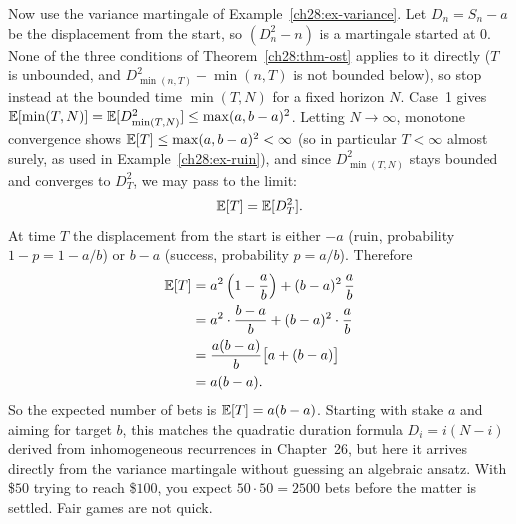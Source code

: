 \begin{example}
\label{ch28:ex-duration}
Now use the variance martingale of Example~\ref{ch28:ex-variance}. Let $D_n = S_n - a$ be the
displacement from the start, so $(D_n^2 - n)$ is a martingale started at $0$. None of the three
conditions of Theorem~\ref{ch28:thm-ost} applies to it directly ($T$ is unbounded, and
$D_{\min(n,T)}^2 - \min(n,T)$ is not bounded below), so stop instead at the bounded time
$\min(T, N)$ for a fixed horizon $N$. Case~1 gives
$\operatorname{\mathbb{E}}[\min(T,N)] = \operatorname{\mathbb{E}}[D_{\min(T,N)}^2] \le \max(a, b-a)^2$. Letting $N \to \infty$, monotone
convergence shows $\operatorname{\mathbb{E}}[T] \le \max(a, b-a)^2 < \infty$ (so in particular $T < \infty$ almost
surely, as used in Example~\ref{ch28:ex-ruin}), and since $D_{\min(T,N)}^2$ stays bounded and
converges to $D_T^2$, we may pass to the limit:
\[
  \operatorname{\mathbb{E}}[T] = \operatorname{\mathbb{E}}[D_T^2].
\]
At time $T$ the displacement from the start is either $-a$ (ruin, probability $1-p = 1 - a/b$) or
$b - a$ (success, probability $p = a/b$). Therefore
\begin{align*}
  \operatorname{\mathbb{E}}[T] &= a^2\left(1 - \frac{a}{b}\right) + (b-a)^2\,\frac{a}{b} \\
        &= a^2 \cdot \frac{b-a}{b} + (b-a)^2 \cdot \frac{a}{b} \\
        &= \frac{a(b-a)}{b}\big[a + (b-a)\big] \\
        &= a(b-a).
\end{align*}
So the expected number of bets is $\operatorname{\mathbb{E}}[T] = a(b-a)$. Starting with stake $a$ and aiming for target $b$,
this matches the quadratic duration formula $D_i = i(N-i)$ derived from inhomogeneous recurrences in
Chapter~26, but here it arrives directly from the variance martingale without guessing an
algebraic ansatz. With \$$50$ trying to reach \$$100$, you expect $50\cdot 50 = 2500$ bets before the
matter is settled. Fair games are not quick.
\end{example}

